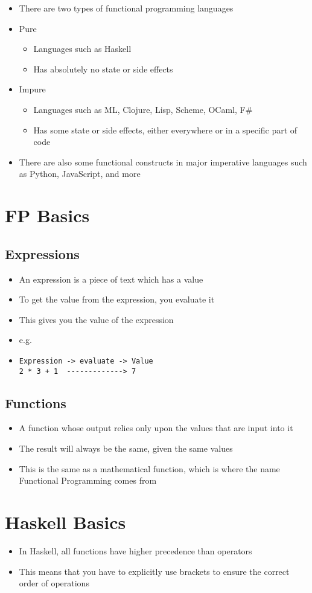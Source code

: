 \begin{itemize}
  \item There are two types of functional programming languages
  \item Pure
  \begin{itemize}
    \item Languages such as Haskell
    \item Has absolutely no state or side effects
  \end{itemize}
  \item Impure
  \begin{itemize}
    \item Languages such as ML, Clojure, Lisp, Scheme, OCaml, F\#
    \item Has some state or side effects, either everywhere or in a specific part of code
  \end{itemize}
  \item There are also some functional constructs in major imperative languages such as Python, JavaScript, and more
\end{itemize}

\section*{FP Basics}

\subsection*{Expressions}

\begin{itemize}
  \item An expression is a piece of text which has a value
  \item To get the value from the expression, you evaluate it
  \item This gives you the value of the expression
  \item e.g.
  \item \begin{verbatim}
Expression -> evaluate -> Value
2 * 3 + 1  -------------> 7
  \end{verbatim}
\end{itemize}

\subsection*{Functions}

\begin{itemize}
  \item A function whose output relies only upon the values that are input into it
  \item The result will always be the same, given the same values
  \item This is the same as a mathematical function, which is where the name Functional Programming comes from
\end{itemize}

\section*{Haskell Basics}

\begin{itemize}
  \item In Haskell, all functions have higher precedence than operators
  \item This means that you have to explicitly use brackets to ensure the correct order of operations
\end{itemize}